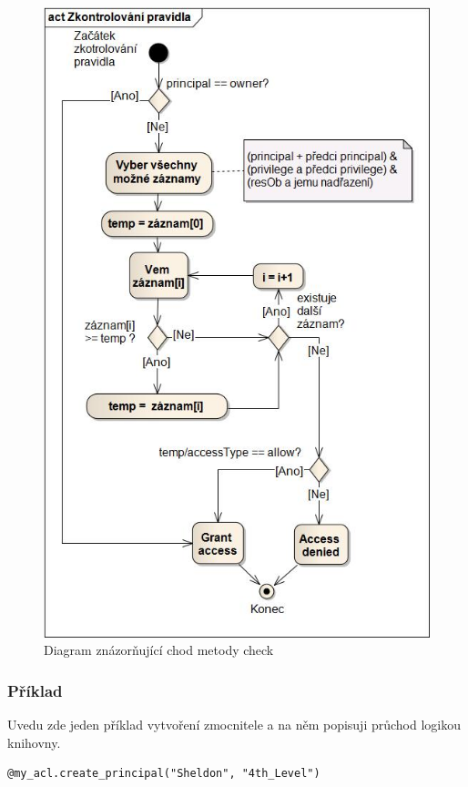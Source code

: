 \begin{figure}
\includegraphics[width=15cm]{check2.jpg}
\caption{Diagram znázorňující chod metody check}
\label{fig:check}
\end{figure}

\subsubsection{Příklad}
\label{Příklad}
Uvedu zde jeden příklad vytvoření zmocnitele a na něm popisuji průchod logikou knihovny.
\\
\lstset{language=Ruby, numbers=none}
\begin{lstlisting}
@my_acl.create_principal("Sheldon", "4th_Level")
\end{lstlisting}

